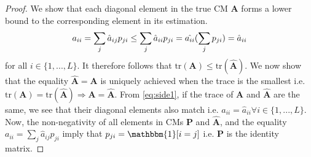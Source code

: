\begin{proof}
We show that each diagonal element in the true CM $\textbf{A}$ forms a lower bound to the corresponding element in its estimation. 
\vspace{-1mm}
\begin{equation}\label{eq:side1}
    a_{ii} = \sum_{j} \hat{a}_{ij}p_{ji} \leq \sum_{j}\hat{a}_{ii}p_{ji} = \hat{a_{ii}}(\sum_{j}p_{ji}) = \hat{a}_{ii} 
\vspace{-2mm}
\end{equation}
for all $i\in\{1,...,L\}$. It therefore follows that $\text{tr}(\textbf{A})\leq \text{tr}(\hat{\textbf{A}})$. We now show that the equality $\hat{\textbf{A}} = \textbf{A}$ is uniquely achieved when the trace is the smallest i.e. $\text{tr}(\textbf{A})= \text{tr}(\hat{\textbf{A}})	\Rightarrow \textbf{A} = \hat{\textbf{A}}$. From \eqref{eq:side1}, if the trace of $\textbf{A}$ and $\hat{\textbf{A}}$ are the same, we see that their diagonal elements also match i.e. $ a_{ii} = \hat{a}_{ii} \forall i\in\{1,...,L\}$. Now, the non-negativity of all elements in CMs $\textbf{P}$ and $\hat{\textbf{A}}$, and the equality $a_{ii} = \sum_{j} \hat{a}_{ij}p_{ji}$ imply that $p_{ji} = \mathbbm{1}[i=j]$ i.e. $\textbf{P}$ is the identity matrix.%



\end{proof}

